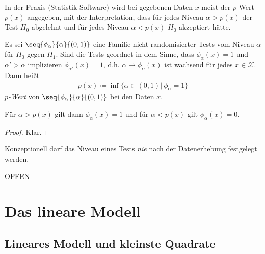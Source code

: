 \documentclass[a4paper]{scrartcl}
\begin{document}
		\begin{motivation}
			In der Praxis (Statistik-Software) wird bei gegebenen Daten $x$ meist der $p$-Wert $p(x)$ angegeben, mit der Interpretation, dass für jedes Niveau $\alpha>p(x)$ der Test $H_0$ abgelehnt und für jedes Niveau $\alpha<p(x)$ $H_0$ akzeptiert hätte.
		\end{motivation}
		\begin{definition}
			Es sei $\seq{\phi_\alpha}{\alpha}{(0,1)}$ eine Familie nicht-randomisierter Tests vom Niveau $\alpha$ für $H_0$ gegen $H_1$. Sind die Tests geordnet in dem Sinne, dass $\phi_\alpha(x)=1$ und $\alpha'>\alpha$ implizieren $\phi_{\alpha'}(x)=1$, d.h. $\alpha\mapsto \phi_\alpha(x)$ ist wachsend für jedes $x\in\mathcal{X}$. Dann heißt
			\begin{align*}
				p(x)\coloneq\inf\{\alpha\in(0,1)|~\phi_\alpha=1\}
			\end{align*}
			\emph{$p$-Wert} von $\seq{\phi_\alpha}{\alpha}{(0,1)}$ bei den Daten $x$.
		\end{definition}
		\begin{lemma}
			Für $\alpha>p(x)$ gilt dann $\phi_\alpha(x)=1$ und für $\alpha<p(x)$ gilt $\phi_\alpha(x)=0$.
		\end{lemma}
		\begin{proof}
			Klar.
		\end{proof}
		\begin{remark}
			Konzeptionell darf das Niveau eines Tests \emph{nie} nach der Datenerhebung festgelegt werden.
		\end{remark}
		\begin{lemma}[Konsistenzsatz]
			OFFEN
		\end{lemma}
		
\newpage
\section{Das lineare Modell}

	\subsection{Lineares Modell und kleinste Quadrate}
	
\end{document}
